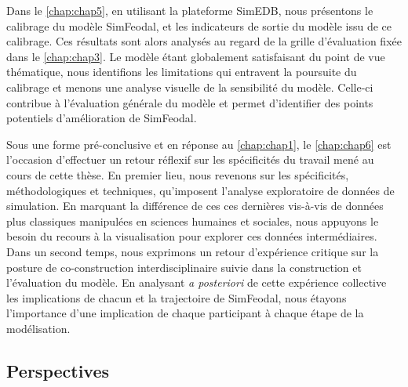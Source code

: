 Dans le \cref{chap:chap5}, en utilisant la plateforme SimEDB, nous présentons le calibrage du modèle SimFeodal, et les indicateurs de sortie du modèle issu de ce calibrage.
Ces résultats sont alors analysés au regard de la grille d'évaluation fixée dans le \cref{chap:chap3}.
Le modèle étant globalement satisfaisant du point de vue thématique, nous identifions les limitations qui entravent la poursuite du calibrage et menons une analyse visuelle de la sensibilité du modèle.
Celle-ci contribue à l'évaluation générale du modèle et permet d'identifier des points potentiels d'amélioration de SimFeodal.

Sous une forme \og pré-conclusive\fg{} et en réponse au \cref{chap:chap1}, le \cref{chap:chap6} est l'occasion d'effectuer un retour réflexif sur les spécificités du travail mené au cours de cette thèse.
En premier lieu, nous revenons sur les spécificités, méthodologiques et techniques, qu'imposent l'analyse exploratoire de données de simulation.
En marquant la différence de ces ces dernières vis-à-vis de données plus classiques manipulées en sciences humaines et sociales, nous appuyons le besoin du recours à la visualisation pour explorer ces \og données intermédiaires\fg{}.
Dans un second temps, nous exprimons un retour d'expérience critique sur la posture de co-construction interdisciplinaire suivie dans la construction et l'évaluation du modèle.
En analysant \textit{a posteriori} de cette expérience collective les implications de chacun et la trajectoire de SimFeodal, nous étayons l'importance d'une implication de chaque participant à chaque étape de la modélisation.


\subsection*{Perspectives}

